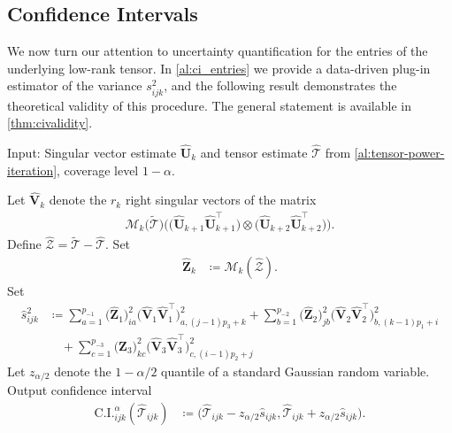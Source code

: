 \documentclass[10pt]{article}
\newcommand{\0}{{\mathbf{0}}}
\newcommand{\1}{{\mathbf{1}}}
\renewcommand{\t}{^{\top}}
\newcommand{\uhat}{\mathbf{\hat{U}}}
\renewcommand{\tilde}{\widetilde}
\renewcommand{\hat}{\widehat}
\renewcommand{\hat}{\widehat}
\newcommand{\red}{\color{red}}
\begin{document}
 


\subsection{Confidence Intervals} \label{sec:entrywiseinference}

We now turn our attention to uncertainty quantification for the  entries of the underlying low-rank tensor. 
In  \cref{al:ci_entries} we provide a data-driven plug-in estimator of the variance $s^2_{ijk}$, and the following result demonstrates the theoretical validity of this procedure. The general statement is available in \cref{thm:civalidity}.  

  \begin{algorithm}[t]
	\caption{Confidence Intervals for $\mathcal{T}_{ijk}$}
	\begin{algorithmic}[1]
		\State Input:  Singular vector estimate $\uhat_k$ and tensor estimate $\mathcal{\hat T}$ from \cref{al:tensor-power-iteration}, coverage level $1 - \alpha$.
		
			\State Let $\mathbf{\hat V}_k$ denote the $r_k$ right singular vectors of the matrix
		\begin{align*}
		    \mathcal{M}_k\big(  \mathcal{\tilde T} \big) \bigg( \big(\uhat_{k+1} \uhat_{k+1}\t \big) \otimes \big(\uhat_{k+2} \uhat_{k+2}\t \big) \bigg).
		\end{align*}
	\State Define $\mathcal{\hat Z} = \mathcal{\tilde T} - \mathcal{\hat T}$. Set
		\begin{align*}
		   \mathbf{\hat Z}_k &\coloneqq \mathcal{M}_k( \mathcal{\hat Z}).
		\end{align*}
		\State Set %
\begin{align*}
    \hat s^2_{ijk} &\coloneqq \sum_{a=1}^{p_{-1}} \big( \mathbf{\hat Z}_1 \big)_{ia}^2 \big( \mathbf{\hat V}_1 \mathbf{\hat V}_1\t \big)_{a,(j-1)p_3 + k}^2 + \sum_{b=1}^{p_{-2}} \big( \mathbf{\hat Z}_2 \big)_{jb}^2 \big( \mathbf{\hat V}_2 \mathbf{\hat V}_2\t \big)_{b,(k-1)p_1 + i}^2 \\
    &\quad + \sum_{c=1}^{p_{-3}} \big( \mathbf{\hat Z}_3 \big)_{kc}^2 \big( \mathbf{\hat V}_3 \mathbf{\hat V}_3\t \big)_{c,(i-1)p_2 + j}^2
\end{align*}
\State Let $z_{\alpha/2}$ denote the $1 - \alpha/2$ quantile of a standard Gaussian random variable.
\State Output confidence interval
\begin{align*}
    \mathrm{C.I.}^{\alpha}_{ijk}(\mathcal{\hat T}_{ijk}) &\coloneqq \big( \mathcal{\hat T}_{ijk} - z_{\alpha/2} \hat s_{ijk}, \mathcal{\hat T}_{ijk} + z_{\alpha/2} \hat s_{ijk} \big).
\end{align*}
		\end{algorithmic}\label{al:ci_entries}
\end{algorithm}
\end{document}
